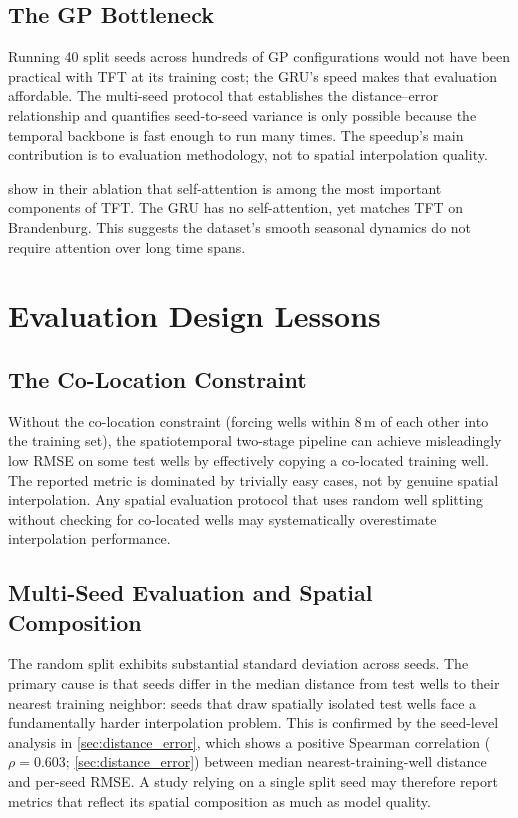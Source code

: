 \subsection{The GP Bottleneck}

Running 40 split seeds across hundreds of GP configurations would not have been practical with TFT at its training cost; the GRU's speed makes that evaluation affordable. The multi-seed protocol that establishes the distance--error relationship and quantifies seed-to-seed variance is only possible because the temporal backbone is fast enough to run many times. The speedup's main contribution is to evaluation methodology, not to spatial interpolation quality.

\citet{lim2021temporal} show in their ablation that self-attention is among the most important components of TFT. The GRU has no self-attention, yet matches TFT on Brandenburg. This suggests the dataset's smooth seasonal dynamics do not require attention over long time spans.

\section{Evaluation Design Lessons}
\label{sec:protocol_lessons}

\subsection{The Co-Location Constraint}

Without the co-location constraint (forcing wells within 8\,m of each other into the training set), the spatiotemporal two-stage pipeline can achieve misleadingly low RMSE on some test wells by effectively copying a co-located training well. The reported metric is dominated by trivially easy cases, not by genuine spatial interpolation. Any spatial evaluation protocol that uses random well splitting without checking for co-located wells may systematically overestimate interpolation performance.

\subsection{Multi-Seed Evaluation and Spatial Composition}

The random split exhibits substantial standard deviation across seeds. The primary cause is that seeds differ in the median distance from test wells to their nearest training neighbor: seeds that draw spatially isolated test wells face a fundamentally harder interpolation problem. This is confirmed by the seed-level analysis in \cref{sec:distance_error}, which shows a positive Spearman correlation ($\rho = 0.603$; \cref{sec:distance_error}) between median nearest-training-well distance and per-seed RMSE. A study relying on a single split seed may therefore report metrics that reflect its spatial composition as much as model quality.

